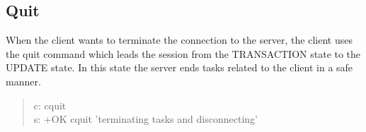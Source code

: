 \documentclass[a4paper,11pt]{article}
\begin{document}
\subsection{Quit}
When the client wants to terminate the connection to the server, the client uses the quit command which leads the session from the TRANSACTION state to the UPDATE state. In this state the server ends tasks related to the client in a safe manner.

\begin{quote}
  c: cquit\\
  s: +OK cquit 'terminating tasks and disconnecting'
\end{quote}
\end{document}
